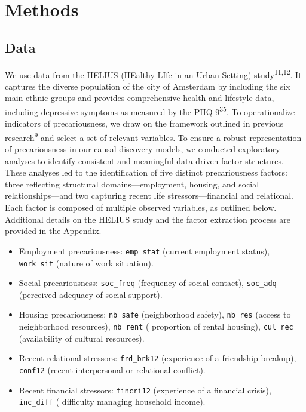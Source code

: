 \documentclass[
]{article}
\providecommand{\tightlist}{%
  \setlength{\itemsep}{0pt}\setlength{\parskip}{0pt}}\usepackage{longtable,booktabs,array}
\begin{document}
\section{Methods}\label{sec-methods}

\subsection{Data}\label{data}

We use data from the HELIUS (HEalthy LIfe in an Urban Setting)
study\textsuperscript{11,12}. It captures the diverse population of the
city of Amsterdam by including the six main ethnic groups and provides
comprehensive health and lifestyle data, including depressive symptoms
as measured by the PHQ-9\textsuperscript{35}. To operationalize
indicators of precariousness, we draw on the framework outlined in
previous research\textsuperscript{9} and select a set of relevant
variables. To ensure a robust representation of precariousness in our
causal discovery models, we conducted exploratory analyses to identify
consistent and meaningful data-driven factor structures. These analyses
led to the identification of five distinct precariousness factors: three
reflecting structural domains---employment, housing, and social
relationships---and two capturing recent life stressors---financial and
relational. Each factor is composed of multiple observed variables, as
outlined below. Additional details on the HELIUS study and the factor
extraction process are provided in the
\hyperref[sec-appendix]{Appendix}.

\begin{itemize}
\tightlist
\item
  Employment precariousness: \texttt{emp\_stat} (current employment
  status), \texttt{work\_sit} (nature of work situation).
\item
  Social precariousness: \texttt{soc\_freq} (frequency of social
  contact), \texttt{soc\_adq} (perceived adequacy of social support).
\item
  Housing precariousness: \texttt{nb\_safe} (neighborhood safety),
  \texttt{nb\_res} (access to neighborhood resources), \texttt{nb\_rent}
  ( proportion of rental housing), \texttt{cul\_rec} (availability of
  cultural resources).
\item
  Recent relational stressors: \texttt{frd\_brk12} (experience of a
  friendship breakup), \texttt{conf12} (recent interpersonal or
  relational conflict).
\item
  Recent financial stressors: \texttt{fincri12} (experience of a
  financial crisis), \texttt{inc\_diff} ( difficulty managing household
  income).
\end{itemize}
\end{document}
